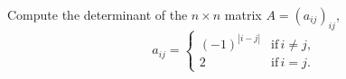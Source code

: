 Compute the determinant of the $n\times n$ matrix $A=(a_{ij})_{ij}$,
$$a_{ij}=\begin{cases}
(-1)^{|i-j|} & \text{if}\, i\ne j,\\
2 & \text{if}\, i= j.
\end{cases}$$